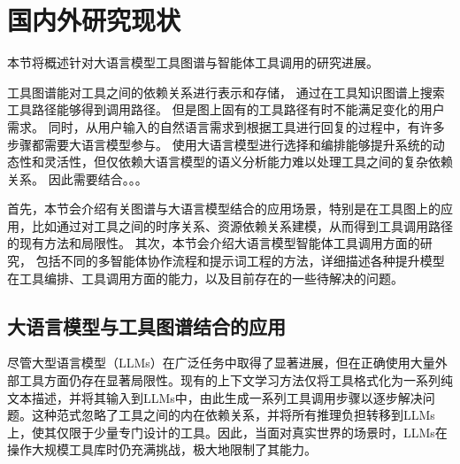 \section{国内外研究现状}

本节将概述针对大语言模型工具图谱与智能体工具调用的研究进展。

工具图谱能对工具之间的依赖关系进行表示和存储，
通过在工具知识图谱上搜索工具路径能够得到调用路径。
但是图上固有的工具路径有时不能满足变化的用户需求。
同时，从用户输入的自然语言需求到根据工具进行回复的过程中，有许多步骤都需要大语言模型参与。
使用大语言模型进行选择和编排能够提升系统的动态性和灵活性，但仅依赖大语言模型的语义分析能力难以处理工具之间的复杂依赖关系。
因此需要结合。。。


首先，本节会介绍有关图谱与大语言模型结合的应用场景，特别是在工具图上的应用，比如通过对工具之间的时序关系、资源依赖关系建模，从而得到工具调用路径的现有方法和局限性。
其次，本节会介绍大语言模型智能体工具调用方面的研究，
包括不同的多智能体协作流程和提示词工程的方法，详细描述各种提升模型在工具编排、工具调用方面的能力，以及目前存在的一些待解决的问题。

\subsection{大语言模型与工具图谱结合的应用}





尽管大型语言模型（LLMs）在广泛任务中取得了显著进展，但在正确使用大量外部工具方面仍存在显著局限性。现有的上下文学习方法仅将工具格式化为一系列纯文本描述，并将其输入到LLMs中，由此生成一系列工具调用步骤以逐步解决问题。这种范式忽略了工具之间的内在依赖关系，并将所有推理负担转移到LLMs上，使其仅限于少量专门设计的工具。因此，当面对真实世界的场景时，LLMs在操作大规模工具库时仍充满挑战，极大地限制了其能力。

